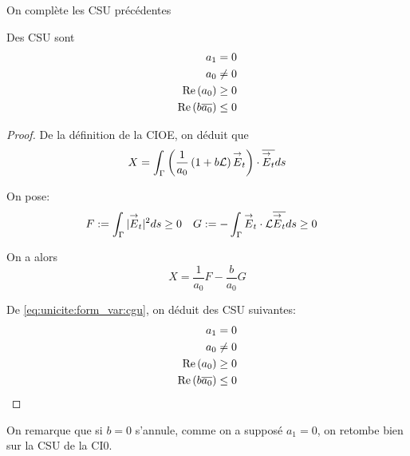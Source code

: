         On complète les CSU précédentes
        \begin{prop}
          Des CSU sont
          \begin{align}
            a_1 = 0 \\
            a_0 \not= 0\\
            \operatorname{Re}\left(a_0\right) \ge 0\\
            \operatorname{Re}\left(b{\overline{a_0}}\right) \le 0
          \end{align}
        \end{prop}
        \begin{proof}
          De la définition de la CIOE, on déduit que
          \[
            X = \int_\Gamma \left( \dfrac{1}{a_0}\left(1+b\mathcal{L}\right){\overset{\rightarrow}{E}}_t\right) \cdot {\overline{{\overset{\rightarrow}{E}}_t}} ds
          \]

          On pose:
          \begin{align*}
            F&:= \int_\Gamma | {\overset{\rightarrow}{E}}_t | ^2 ds \ge 0 & G &:= -\int_\Gamma {\overset{\rightarrow}{E}}_t \cdot \mathcal{L}{\overline{{\overset{\rightarrow}{E}}_t}} ds \ge 0
          \end{align*}

          On a alors
          \begin{equation}
            \label{eq:unicite:form_var:decomp_cgu_ci1_a1_nul}
            X = \frac{1}{a_0}F - \frac{b}{a_0}G
          \end{equation}

          De \eqref{eq:unicite:form_var:cgu}, on déduit des CSU suivantes:
          \begin{align}
            a_1 = 0 \\
            a_0 \not= 0\\
            \operatorname{Re}\left(a_0\right) \ge 0\\
            \operatorname{Re}\left(b{\overline{a_0}}\right) \le 0
          \end{align}
        \end{proof}

        On remarque que si \(b=0\) s’annule, comme on a supposé \(a_1=0\), on retombe bien sur la CSU de la CI0.


